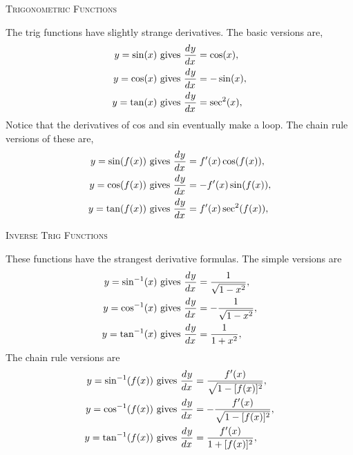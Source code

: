 \documentclass[a4paper,10pt]{article}
\newcommand{\deriv}[3][ ]{\ensuremath\frac{d^{#1}#2}{d#3^{#1}}}
\begin{document}
\begin{multicols*}{2}
{\large\textsc{Trigonometric Functions}}

The trig functions have slightly strange derivatives. The basic versions are,
\begin{align*}
y = \sin(x) &\mathrm{~gives~} \deriv{y}{x} = \cos(x), \\
y = \cos(x) &\mathrm{~gives~} \deriv{y}{x} = -\sin(x), \\
y = \tan(x) &\mathrm{~gives~} \deriv{y}{x} = \sec^2(x), \\
\end{align*}
Notice that the derivatives of cos and sin eventually make a loop. 
The chain rule versions of these are,
\begin{align*}
y = \sin(f(x)) &\mathrm{~gives~} \deriv{y}{x} = f'(x)\cos(f(x)), \\
y = \cos(f(x)) &\mathrm{~gives~} \deriv{y}{x} = -f'(x)\sin(f(x)), \\
y = \tan(f(x)) &\mathrm{~gives~} \deriv{y}{x} = f'(x)\sec^2(f(x)), \\
\end{align*}

{\large\textsc{Inverse Trig Functions}}

These functions have the strangest derivative formulas. The simple versions 
are 
\begin{align*}
y = \sin^{-1}(x) &\mathrm{~gives~} \deriv{y}{x} = \frac{1}{\sqrt{1-x^2}}, \\
y = \cos^{-1}(x) &\mathrm{~gives~} \deriv{y}{x} = -\frac{1}{\sqrt{1-x^2}}, \\
y = \tan^{-1}(x) &\mathrm{~gives~} \deriv{y}{x} = \frac{1}{1+x^2}, \\
\end{align*}
The chain rule versions are
\begin{align*}
y = \sin^{-1}(f(x)) &\mathrm{~gives~} \deriv{y}{x} = \frac{f'(x)}{\sqrt{1-[f(x)]^2}}, \\
y = \cos^{-1}(f(x)) &\mathrm{~gives~} \deriv{y}{x} = -\frac{f'(x)}{\sqrt{1-[f(x)]^2}}, \\
y = \tan^{-1}(f(x)) &\mathrm{~gives~} \deriv{y}{x} = \frac{f'(x)}{1+[f(x)]^2}, \\
\end{align*}

\end{multicols*}
\end{document}
